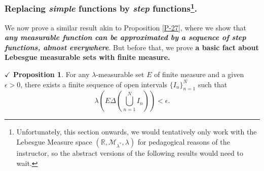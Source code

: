 \documentclass{article}
\theoremstyle{definition}
\theoremstyle{remark}
\theoremstyle{definition}
\theoremstyle{definition}
\newtheorem{proposition}{$\checkmark$ Proposition}
\theoremstyle{definition}
\newcommand{\bunion}{\bigcup}
\newcommand{\R}{\mathbb{R}}
\newcommand{\set}[1]{\mathscr{#1}}
\newcommand{\msigm}[1]{\set{M}_{#1}}
\newcommand{\lm}[1]{\lambda\left (#1\right )}
\begin{document}
\subsubsection{Replacing \emph{simple} functions by \emph{step} functions\protect\footnote{Unfortunately, this section onwards, we would tentatively only work with the Lebesgue Measure space $ (\R,\msigm{\lambda^*},\lambda) $ for pedagogical reasons of the instructor, so the abstract versions of the following results would need to wait.}.}
We now prove a similar result akin to Proposition \ref{P-27}, where we show that \emph{\textbf{any measurable function can be approximated by a sequence of step functions, almost everywhere}}. But before that, we prove \textbf{a basic fact about Lebesgue measurable sets with finite measure.}
\begin{proposition}\label{P-29}
	For any $ \lambda $-measurable set $ E $ of finite measure and a given $ \epsilon > 0 $, there exists a finite sequence of open intervals $ \{I_n\}_{n=1}^{N} $ such that 
	\[\lm{E\Delta \left (\bunion_{n=1}^{N}I_n\right )} < \epsilon.\]
\end{proposition}
\end{document}
